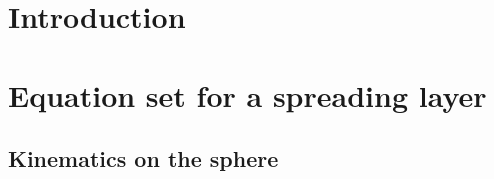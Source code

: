 \documentclass[usenatbib,onecolumn]{mnras}
\begin{document}
\title[]{}
\author[]{ }

\date{Accepted ---. Received ---; in
  original form --- }

\label{firstpage}
\pagerange{\pageref{firstpage}--\pageref{lastpage}} 
\maketitle

\begin{abstract}
\end{abstract}

\begin{keywords}
\end{keywords}

\section{Introduction}

\section{Equation set for a spreading layer}

\subsection{Kinematics on the sphere}\label{E:kinema}
\end{document}
